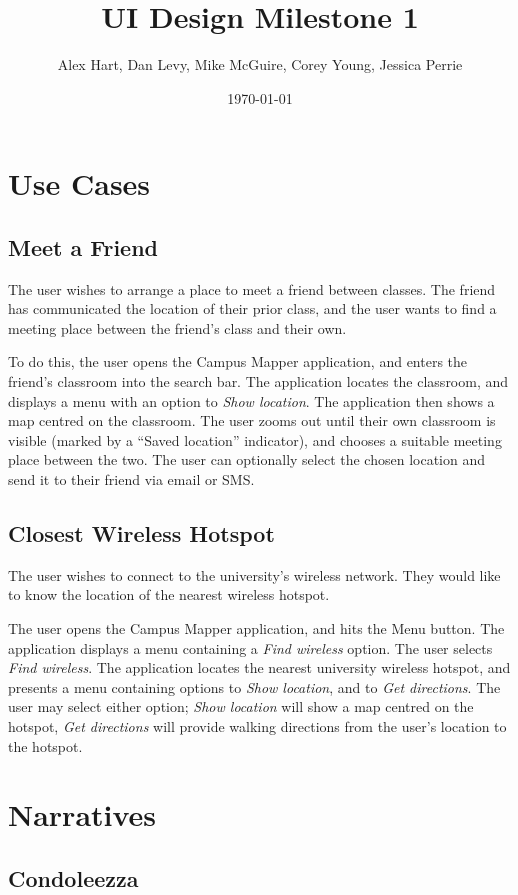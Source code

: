 \documentclass{article}
\title{UI Design Milestone 1}
\author{Alex Hart, Dan Levy, Mike McGuire, Corey Young, Jessica Perrie}
\date{\today}
\begin{document}
\maketitle

\section{Use Cases}
\subsection{Meet a Friend}
The user wishes to arrange a place to meet a friend between classes.
The friend has communicated the location of their prior class, and the user
wants to find a meeting place between the friend's class and their own.

To do this, the user opens the Campus Mapper application, and enters the
friend's classroom into the search bar. The application locates the classroom,
and displays a menu with an option to \emph{Show location}. The application
then shows a map centred on the classroom. The user zooms out until their own
classroom is visible (marked by a ``Saved location'' indicator), and chooses a
suitable meeting place between the two. The user can optionally select the
chosen location and send it to their friend via email or SMS.

\subsection{Closest Wireless Hotspot}
The user wishes to connect to the university's wireless network. They would like
to know the location of the nearest wireless hotspot.

The user opens the Campus Mapper application, and hits the Menu button. The
application displays a menu containing a \emph{Find wireless} option.
The user selects \emph{Find wireless}. The application locates the nearest
university wireless hotspot, and presents a menu containing options to
\emph{Show location}, and to \emph{Get directions}. The user may select either
option; \emph{Show location} will show a map centred on the hotspot, \emph{Get
directions} will provide walking directions from the user's location to the
hotspot.

\section{Narratives}
\subsection{Condoleezza}
\end{document}
